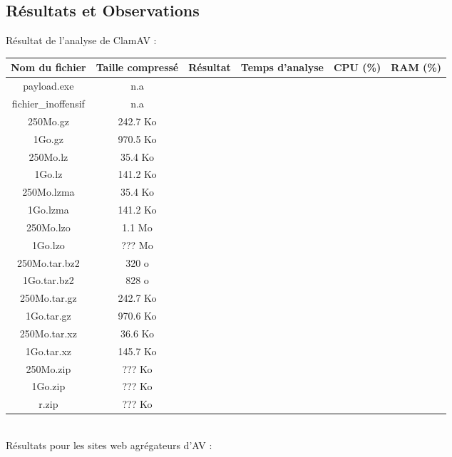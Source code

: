 \documentclass[smallextended]{svjour3}       %
\begin{document}
\subsection{Résultats et Observations}
\label{3.2résultats}
Résultat de l'analyse de ClamAV :\\
\begin{tabular}{|*{6}{c|}}
    \hline
\textbf{Nom du fichier} & \textbf{Taille compressé} & \textbf{Résultat} & \textbf{Temps d'analyse}  & \textbf{CPU (\%)} & \textbf{RAM (\%)}\\
	\hline
payload.exe & n.a &   &   &  & \\
	\hline
fichier\_inoffensif & n.a &   &   &  & \\
	\hline
	\hline
250Mo.gz & 242.7 Ko &   &   &  & \\
	\hline
1Go.gz & 970.5 Ko &   &   &  & \\
    \hline
    \hline
250Mo.lz & 35.4 Ko &   &   &  & \\
	\hline
1Go.lz & 141.2 Ko &   &   &  & \\
    \hline
    \hline
250Mo.lzma & 35.4 Ko &   &   &  & \\
	\hline
1Go.lzma & 141.2 Ko &   &   &  & \\
    \hline
    \hline
250Mo.lzo & 1.1 Mo &   &   &  & \\
	\hline
1Go.lzo & ??? Mo &   &   &  & \\
    \hline
    \hline
250Mo.tar.bz2 & 320 o &   &   &  & \\
	\hline
1Go.tar.bz2 & 828 o &   &   &  & \\
    \hline
    \hline
250Mo.tar.gz & 242.7 Ko &   &   &  & \\
	\hline
1Go.tar.gz & 970.6 Ko &   &   &  & \\
    \hline
    \hline
250Mo.tar.xz & 36.6 Ko &   &   &  & \\
	\hline
1Go.tar.xz & 145.7 Ko &   &   &  & \\
    \hline
    \hline
250Mo.zip & ??? Ko &   &   &  & \\
	\hline
1Go.zip & ??? Ko &   &   &  & \\
    \hline
    \hline
r.zip & ??? Ko &   &   &  & \\
	\hline
\end{tabular}
$ $\\
Résultats pour les sites web agrégateurs d'AV :\\
\end{document}
